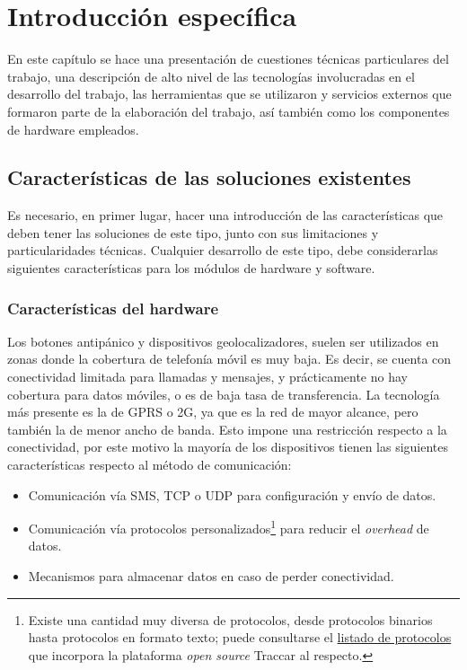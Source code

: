 \chapter{Introducción específica} %

\label{Chapter2}
En este capítulo se hace una presentación de cuestiones técnicas particulares del trabajo, una descripción de alto nivel de las tecnologías involucradas en el desarrollo del trabajo, las herramientas que se utilizaron y servicios externos que formaron parte de la elaboración del trabajo, así también como los componentes de hardware empleados.

\section{Características de las soluciones existentes}

Es necesario, en primer lugar, hacer una introducción de las características que deben tener las soluciones de este tipo, junto con sus limitaciones y particularidades técnicas. Cualquier desarrollo de este tipo, debe considerarlas siguientes características para los módulos de hardware y software.

\subsection{Características del hardware}

Los botones antipánico y dispositivos geolocalizadores, suelen ser utilizados en zonas donde la cobertura de telefonía móvil es muy baja. Es decir, se cuenta con conectividad limitada para llamadas y mensajes, y prácticamente no hay cobertura para datos móviles, o es de baja tasa de transferencia. La tecnología más presente es la de GPRS o 2G\citep{NPERF:1}, ya que es la red de mayor alcance, pero también la de menor ancho de banda.
Esto impone una restricción respecto a la conectividad, por este motivo la mayoría de los dispositivos tienen las siguientes características respecto al método de comunicación:
\begin{itemize}
	\item Comunicación vía SMS, TCP o UDP para configuración y envío de datos.
	\item Comunicación vía protocolos personalizados\footnote{Existe una cantidad muy diversa de protocolos, desde protocolos binarios hasta protocolos en formato texto; puede consultarse el \href{https://www.traccar.org/protocols/}{listado de protocolos} que incorpora la plataforma \textit{open source} Traccar al respecto.} para reducir el \textit{overhead} de datos.
	\item Mecanismos para almacenar datos en caso de perder conectividad.
\end{itemize}

